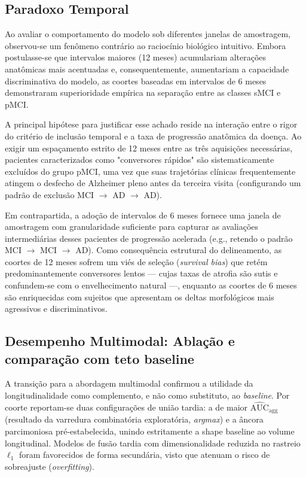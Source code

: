\documentclass[review]{elsarticle}
\begin{document}
	\subsection{Paradoxo Temporal}
	
	Ao avaliar o comportamento do modelo sob diferentes janelas de amostragem, observou-se um fenômeno contrário ao raciocínio biológico intuitivo. Embora postulasse-se que intervalos maiores (12 meses) acumulariam alterações anatômicas mais acentuadas e, consequentemente, aumentariam a capacidade discriminativa do modelo, as coortes baseadas em intervalos de 6 meses demonstraram superioridade empírica na separação entre as classes sMCI e pMCI. 
	
	A principal hipótese para justificar esse achado reside na interação entre o rigor do critério de inclusão temporal e a taxa de progressão anatômica da doença. Ao exigir um espaçamento estrito de 12 meses entre as três aquisições necessárias, pacientes caracterizados como "conversores rápidos" são sistematicamente excluídos do grupo pMCI, uma vez que suas trajetórias clínicas frequentemente atingem o desfecho de Alzheimer pleno antes da terceira visita (configurando um padrão de exclusão MCI $\to$ AD $\to$ AD). 
	
	Em contrapartida, a adoção de intervalos de 6 meses fornece uma janela de amostragem com granularidade suficiente para capturar as avaliações intermediárias desses pacientes de progressão acelerada (e.g., retendo o padrão MCI $\to$ MCI $\to$ AD). Como consequência estrutural do delineamento, as coortes de 12 meses sofrem um viés de seleção (\emph{survival bias}) que retém predominantemente conversores lentos --- cujas taxas de atrofia são sutis e confundem-se com o envelhecimento natural ---, enquanto as coortes de 6 meses são enriquecidas com sujeitos que apresentam os deltas morfológicos mais agressivos e discriminativos.
	
	\subsection{Desempenho Multimodal: Ablação e comparação com teto baseline}
	
	A transição para a abordagem multimodal confirmou a utilidade da longitudinalidade como complemento, e não como substituto, ao \textit{baseline}. Por coorte reportam-se duas configurações de união tardia: a de maior $\widehat{\mathrm{AUC}}_{\mathrm{agg}}$ (resultado da varredura combinatória exploratória, \emph{argmax}) e a âncora parcimoniosa pré-estabelecida, unindo estritamente a shape baseline ao volume longitudinal. Modelos de fusão tardia com dimensionalidade reduzida no rastreio $\ell_1$ foram favorecidos de forma secundária, visto que atenuam o risco de sobreajuste (\emph{overfitting}).
	
\end{document}
